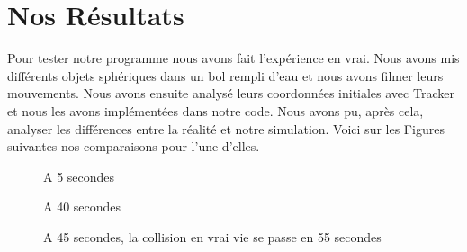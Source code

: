 \section{Nos Résultats}
    Pour tester notre programme nous avons fait l'expérience en vrai. Nous avons mis différents objets sphériques dans un bol rempli d'eau et nous avons filmer leurs mouvements. Nous avons ensuite analysé leurs coordonnées initiales avec Tracker et nous les avons implémentées dans notre code. Nous avons pu, après cela, analyser les différences entre la réalité et notre simulation. Voici sur les Figures suivantes nos comparaisons pour l'une d'elles.


    \begin{figure}[H]
        \centering
        \qquad
        \caption{A 5 secondes}%
        \label{fig:example}%
    \end{figure}
    \begin{figure}[H]
        \centering
        \qquad
        \caption{A 40 secondes}%
        \label{fig:examplee}%
    \end{figure}
    \begin{figure}[H]
        \centering
        \qquad
        \caption{A 45 secondes, la collision en vrai vie se passe en 55 secondes}%
        \label{fig:examples}%
    \end{figure}
    
